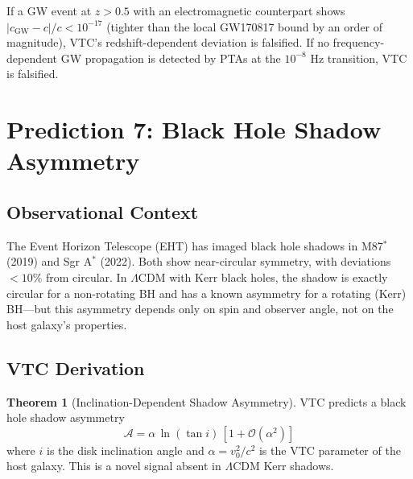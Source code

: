 \documentclass[11pt,a4paper]{article}
\theoremstyle{definition}
\newtheorem{theorem}{Theorem}[section]
\begin{document}
If a GW event at $z > 0.5$ with an electromagnetic counterpart shows $|c_\mathrm{GW} - c|/c < 10^{-17}$ (tighter than the local GW170817 bound by an order of magnitude), VTC's redshift-dependent deviation is falsified. If no frequency-dependent GW propagation is detected by PTAs at the $10^{-8}$ Hz transition, VTC is falsified.

\section{Prediction 7: Black Hole Shadow Asymmetry}
\label{sec:p7}

\subsection{Observational Context}

The Event Horizon Telescope (EHT) has imaged black hole shadows in M87$^\ast$ (2019) and Sgr A$^\ast$ (2022). Both show near-circular symmetry, with deviations $< 10\%$ from circular. In $\Lambda$CDM with Kerr black holes, the shadow is exactly circular for a non-rotating BH and has a known asymmetry for a rotating (Kerr) BH---but this asymmetry depends only on spin and observer angle, not on the host galaxy's properties.

\subsection{VTC Derivation}

\begin{theorem}[Inclination-Dependent Shadow Asymmetry]
\label{thm:p7}
VTC predicts a black hole shadow asymmetry
\begin{equation}
\mathcal{A} = \alpha\,\ln(\tan i)\,[1 + \mathcal{O}(\alpha^2)]
\end{equation}
where $i$ is the disk inclination angle and $\alpha = v_0^2/c^2$ is the VTC parameter of the host galaxy. This is a novel signal absent in $\Lambda$CDM Kerr shadows.
\end{theorem}
\end{document}
